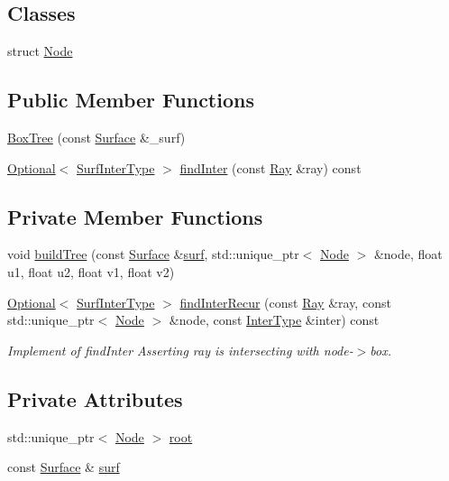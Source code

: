 \subsection*{Classes}
\begin{DoxyCompactItemize}
\item 
struct \hyperlink{structBoxTree_1_1Node}{Node}
\end{DoxyCompactItemize}
\subsection*{Public Member Functions}
\begin{DoxyCompactItemize}
\item 
\hyperlink{classBoxTree_a429e95ce51bc58ecd0e15eb11bac60dd}{Box\+Tree} (const \hyperlink{classSurface}{Surface} \&\+\_\+surf)
\item 
\hyperlink{classOptional}{Optional}$<$ \hyperlink{structSurfInterType}{Surf\+Inter\+Type} $>$ \hyperlink{classBoxTree_a3bfd0be9d94e7b6917a734b0474d8cff}{find\+Inter} (const \hyperlink{structRay}{Ray} \&ray) const 
\end{DoxyCompactItemize}
\subsection*{Private Member Functions}
\begin{DoxyCompactItemize}
\item 
void \hyperlink{classBoxTree_aff124ae5af1c4ecf8187a7473828229b}{build\+Tree} (const \hyperlink{classSurface}{Surface} \&\hyperlink{classBoxTree_a5c38df1ae1af50fa873ebde61b24df67}{surf}, std\+::unique\+\_\+ptr$<$ \hyperlink{structBoxTree_1_1Node}{Node} $>$ \&node, float u1, float u2, float v1, float v2)
\item 
\hyperlink{classOptional}{Optional}$<$ \hyperlink{structSurfInterType}{Surf\+Inter\+Type} $>$ \hyperlink{classBoxTree_a1ce4beeb452ab28f9927d00839f638fe}{find\+Inter\+Recur} (const \hyperlink{structRay}{Ray} \&ray, const std\+::unique\+\_\+ptr$<$ \hyperlink{structBoxTree_1_1Node}{Node} $>$ \&node, const \hyperlink{intersection_8h_a880ab27cdd7ea5eab91289bba0bacadb}{Inter\+Type} \&inter) const 
\begin{DoxyCompactList}\small\item\em Implement of find\+Inter Asserting ray is intersecting with node-\/$>$box. \end{DoxyCompactList}\end{DoxyCompactItemize}
\subsection*{Private Attributes}
\begin{DoxyCompactItemize}
\item 
std\+::unique\+\_\+ptr$<$ \hyperlink{structBoxTree_1_1Node}{Node} $>$ \hyperlink{classBoxTree_a12ff787723bc271b246f2662ce7c59b5}{root}
\item 
const \hyperlink{classSurface}{Surface} \& \hyperlink{classBoxTree_a5c38df1ae1af50fa873ebde61b24df67}{surf}
\end{DoxyCompactItemize}


